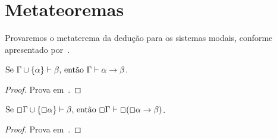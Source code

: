 \section{Metateoremas}
    Provaremos o metaterema da dedução para os sistemas modais, conforme apresentado por~\cite{Hakli}.

    \begin{theorem}
        $\text{Se }\Gamma\cup\{\alpha\}\vdash\beta\text{, então }\Gamma\vdash\alpha\to\beta$.

        \begin{proof}
            Prova em~\cite{Hakli}.
        \end{proof}
    \end{theorem}

    \begin{theorem}
        $\text{Se }\Box\Gamma\cup\{\Box\alpha\}\vdash\beta\text{, então }\Box\Gamma\vdash\Box(\Box\alpha\to\beta)$.

        \begin{proof}
            Prova em~\cite{Marcus}.
        \end{proof}
    \end{theorem}




                
